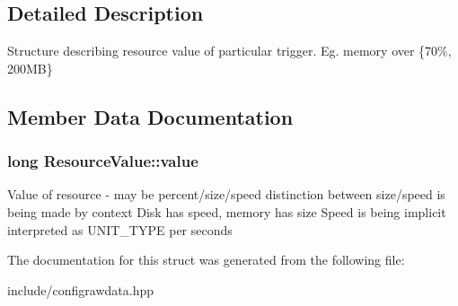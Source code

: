 \subsection{Detailed Description}
Structure describing resource value of particular trigger. Eg. memory over \{70\%, 200\+MB\} 

\subsection{Member Data Documentation}
\subsubsection[{\texorpdfstring{value}{value}}]{\setlength{\rightskip}{0pt plus 5cm}long Resource\+Value\+::value}\hypertarget{structResourceValue_ae99ce89cc98c9032fdf5bccd9320ed2f}{}\label{structResourceValue_ae99ce89cc98c9032fdf5bccd9320ed2f}
Value of resource -\/ may be percent/size/speed distinction between size/speed is being made by context Disk has speed, memory has size Speed is being implicit interpreted as U\+N\+I\+T\+\_\+\+T\+Y\+PE per seconds 

The documentation for this struct was generated from the following file\+:\begin{DoxyCompactItemize}
\item 
include/configrawdata.\+hpp\end{DoxyCompactItemize}

